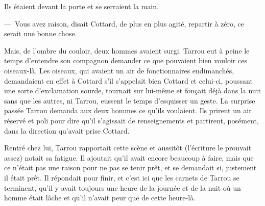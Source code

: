 \documentclass[french,twoside]{book} %
\begin{document}
Ils étaient devant la porte et se serraient la main.\par
— Vous avez raison, disait Cottard, de plus en plus agité, repartir à zéro, ce serait une bonne chose.\par
Mais, de l’ombre du couloir, deux hommes avaient surgi. Tarrou eut à peine le temps d’entendre son compagnon demander ce que pouvaient bien vouloir ces oiseaux-là. Les oiseaux, qui avaient un air de fonctionnaires endimanchés, demandaient en effet à Cottard s’il s’appelait bien Cottard et celui-ci, poussant une sorte d’exclamation sourde, tournait sur lui-même et fonçait déjà dans la nuit sans que les autres, ni Tarrou, eussent le temps d’esquisser un geste. La surprise passée Tarrou demanda aux deux hommes ce qu’ils voulaient. Ils prirent un air réservé et poli pour dire qu’il s’agissait de renseignements et partirent, posément, dans la direction qu’avait prise Cottard.\par
Rentré chez lui, Tarrou rapportait cette scène et aussitôt (l’écriture le prouvait assez) notait sa fatigue. Il ajoutait qu’il avait encore beaucoup à faire, mais que ce n’était pas une raison pour ne pas se tenir prêt, et se demandait si, justement il était prêt. Il répondait pour finir, et c’est ici que les carnets de Tarrou se terminent, qu’il y avait toujours une heure de la journée et de la nuit où un homme était lâche et qu’il n’avait peur que de cette heure-là.
\end{document}
